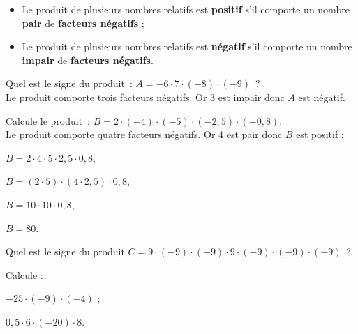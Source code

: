  
 \begin{aconnaitre}
 \begin{itemize}
  \item Le produit de plusieurs nombres relatifs est \textbf{positif} s'il comporte un nombre \textbf{pair} de \textbf{facteurs négatifs} ;
  \item Le produit de plusieurs nombres relatifs est \textbf{négatif} s'il comporte un nombre \textbf{impair} de \textbf{facteurs négatifs}.
  \end{itemize}
\end{aconnaitre}

\begin{methode*1}

 \begin{exemple*1}
Quel est le signe du produit : $A = -6 \cdot 7 \cdot (-8) \cdot (-9)$ ? \\[0.5em]
Le produit comporte trois facteurs négatifs. Or 3 est impair donc $A$ est négatif.
 \end{exemple*1}
 
  \begin{exemple*1}
Calcule le produit : $B = 2 \cdot (-4) \cdot (-5) \cdot (-2,5) \cdot (-0,8)$. \\[0.5em]
Le produit comporte quatre facteurs négatifs. Or 4 est pair donc $B$ est positif :

$B = 2 \cdot 4 \cdot 5 \cdot 2,5 \cdot 0,8$,
       
$B = (2 \cdot 5) \cdot (4 \cdot 2,5) \cdot 0,8$,
       
$B = 10 \cdot 10 \cdot 0,8$,
       
$B = 80$.
 \end{exemple*1}
 
 \exercice  
Quel est le signe du produit $C = 9 \cdot (-9) \cdot (-9) \cdot 9 \cdot (-9) \cdot (-9) \cdot (-9)$ ?
     
 \exercice  
Calcule :
\begin{colenumerate}{2}
 \item $-25 \cdot (-9) \cdot (-4)$ ;
 \item $0,5 \cdot 6 \cdot (-20) \cdot 8$.
 \end{colenumerate}

 \end{methode*1}
 
 
